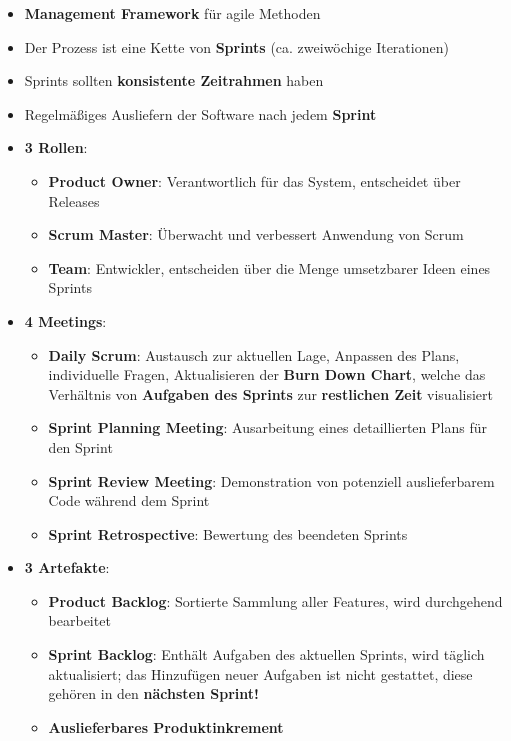 \begin{itemize}
	\item \textbf{Management Framework} für agile Methoden
	\item Der Prozess ist eine Kette von \textbf{Sprints} (ca. zweiwöchige Iterationen)
	\item Sprints sollten \textbf{konsistente Zeitrahmen} haben
	\item Regelmäßiges Ausliefern der Software nach jedem \textbf{Sprint}
	\item \textbf{3 Rollen}:
	\begin{itemize}
		\item \textbf{Product Owner}: Verantwortlich für das System, entscheidet über Releases
		\item \textbf{Scrum Master}: Überwacht und verbessert Anwendung von Scrum
		\item \textbf{Team}: Entwickler, entscheiden über die Menge umsetzbarer Ideen eines Sprints
	\end{itemize}
	\item \textbf{4 Meetings}:
	\begin{itemize}
		\item \textbf{Daily Scrum}: Austausch zur aktuellen Lage, Anpassen des Plans, individuelle Fragen, Aktualisieren der \textbf{Burn Down Chart}, welche das Verhältnis von \textbf{Aufgaben des Sprints} zur \textbf{restlichen Zeit} visualisiert
		\item \textbf{Sprint Planning Meeting}: Ausarbeitung eines detaillierten Plans für den Sprint
		\item \textbf{Sprint Review Meeting}: Demonstration von potenziell auslieferbarem Code während dem Sprint
		\item \textbf{Sprint Retrospective}: Bewertung des beendeten Sprints
	\end{itemize}
	\item \textbf{3 Artefakte}:
	\begin{itemize}
		\item \textbf{Product Backlog}: Sortierte Sammlung aller Features, wird durchgehend bearbeitet
		\item \textbf{Sprint Backlog}: Enthält Aufgaben des aktuellen Sprints, wird täglich aktualisiert; das Hinzufügen neuer Aufgaben ist nicht gestattet, diese gehören in den \textbf{nächsten Sprint!}
		\item \textbf{Auslieferbares Produktinkrement}
	\end{itemize}
\end{itemize}